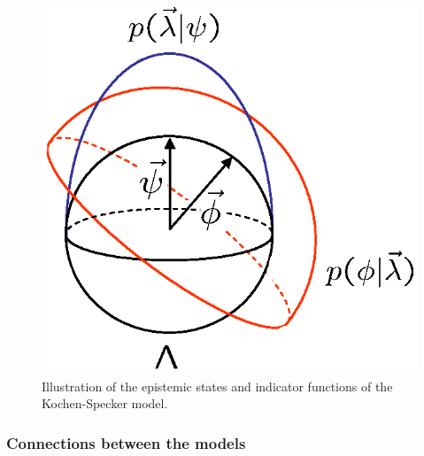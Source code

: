 \documentclass[aps,nofootinbib,12pt]{revtex4}
\begin{document}
\begin{figure}[t]
\includegraphics[scale=0.6]{ksmodel}\caption{Illustration of the epistemic
states and indicator functions of the Kochen-Specker model.}
\label{FIG:ksmodel}
\end{figure}

\subsubsection{Connections between the models}
\end{document}
